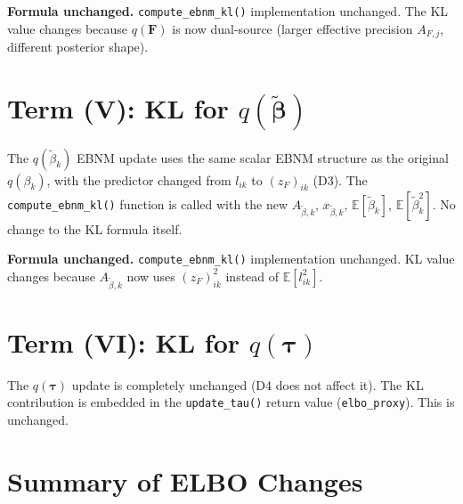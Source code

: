 \documentclass[11pt]{article}
\newcommand{\E}{\mathbb{E}}
\begin{document}
\begin{verifybox}
\textbf{Formula unchanged.} \texttt{compute\_ebnm\_kl()} implementation unchanged.
The KL value changes because $q(\mathbf{F})$ is now dual-source (larger effective precision
$A_{F,j}$, different posterior shape).
\end{verifybox}

\section{Term (V): KL for $q(\tilde{\boldsymbol\beta})$}

The $q(\tilde\beta_k)$ EBNM update uses the same scalar EBNM structure as the original
$q(\beta_k)$, with the predictor changed from $l_{ik}$ to $(z_F)_{ik}$ (D3). The
\texttt{compute\_ebnm\_kl()} function is called with the new $A_{\tilde\beta,k}$,
$x_{\tilde\beta,k}$, $\E[\tilde\beta_k]$, $\E[\tilde\beta_k^2]$. No change to the KL
formula itself.

\begin{verifybox}
\textbf{Formula unchanged.} \texttt{compute\_ebnm\_kl()} implementation unchanged.
KL value changes because $A_{\tilde\beta,k}$ now uses $(z_F)_{ik}^2$ instead of $\E[l_{ik}^2]$.
\end{verifybox}

\section{Term (VI): KL for $q(\boldsymbol\tau)$}

The $q(\boldsymbol\tau)$ update is completely unchanged (D4 does not affect it).
The KL contribution is embedded in the \texttt{update\_tau()} return value
(\texttt{elbo\_proxy}). This is unchanged.

\section{Summary of ELBO Changes}
\end{document}
